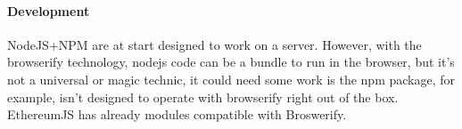 \paragraph{Development} NodeJS+NPM are at start designed to work on a server. However, with the browserify technology, nodejs code can be a bundle to run in the browser, but it's not a universal or magic technic, it could need some work is the npm package, for example, isn't designed to operate with browserify right out of the box. EthereumJS has already modules compatible with Broswerify.



